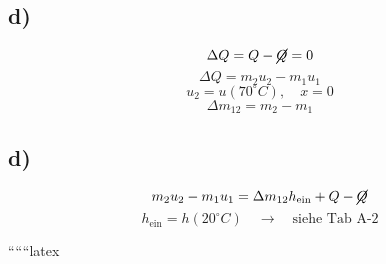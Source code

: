 

\subsection*{d)}
\[
\Delta Q = Q - \cancel{Q} = 0
\]
\[
\Delta Q = m_2 u_2 - m_1 u_1
\]
\[
u_2 = u \left(70^\circ C\right), \quad x = 0
\]
\[
\Delta m_{12} = m_2 - m_1
\]



\subsection*{d)}
\[
m_2 u_2 - m_1 u_1 = \Delta m_{12} h_{\text{ein}} + Q - \cancel{Q}
\]
\[
h_{\text{ein}} = h \left(20^\circ C\right) \quad \rightarrow \quad \text{siehe Tab A-2}
\]

``````latex